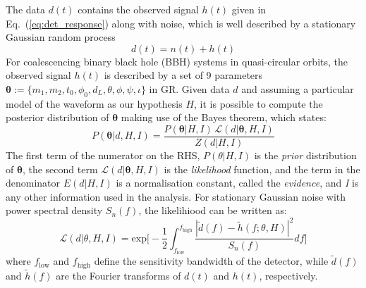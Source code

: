 \documentclass[prl,preprintnumbers,twocolumn,eqsecnum,floatfix,a4paper,nofootinbib,superscriptaddress]{revtex4}
\newcommand{\btheta}{\bm{\theta}}
\begin{document}
The data $d(t)$ contains the observed signal $h(t)$ given in Eq.~(\ref{eq:det_response}) along with noise, which is well described by a stationary Gaussian random process 
\begin{equation}
d(t) = n(t) + h(t)
\label{eq:detector_strain}
\end{equation}
For coalescencing binary black hole (BBH) systems in quasi-circular orbits, the observed signal $h(t)$ is described by a set of 9 parameters $\btheta := \{m_1, m_2, t_0, \phi_0, d_L, \theta, \phi, \psi, \iota\}$ in GR. Given data $d$ and assuming a particular model of the waveform as our hypothesis $H$, it is possible to compute the posterior distribution of $\btheta$ making use of the Bayes theorem, which states: 
\begin{equation}
P(\btheta|d, H, I) = \frac{P(\btheta|H, I) \, \mathcal{L}(d|\btheta, H, I)}{Z(d|H, I)}
\label{eq:Bayes_theorem}
\end{equation} 
The first term of the numerator on the RHS, $P(\theta|H,I)$ is the \emph{prior} distribution of $\btheta$, the second term $\mathcal{L}(d|\btheta, H,I)$ is the \emph{likelihood} function, and the term in the denominator $E(d|H,I)$ is a normalisation constant, called the \emph{evidence}, and \emph{I} is any other information used in the analysis. For stationary Gaussian noise with power spectral density $S_n(f)$, the likelihiood can be written as:
\begin{equation}
\mathcal{L}({d}|\theta, H,I) = \text{exp}\Big[ -\frac{1}{2}\int_{f_\mathrm{low}}^{f_\mathrm{high}} \frac{|\tilde{d}(f) - \tilde{h}(f;\theta, H)|^2}{S_n(f)}df\Big]
\end{equation}
where $f_\mathrm{low}$ and $f_\mathrm{high}$ define the sensitivity bandwidth of the detector, while $\tilde{d}(f)$ and $\tilde{h}(f)$ are the Fourier transforms of $d(t)$ and $h(t)$, respectively. 
\end{document}
